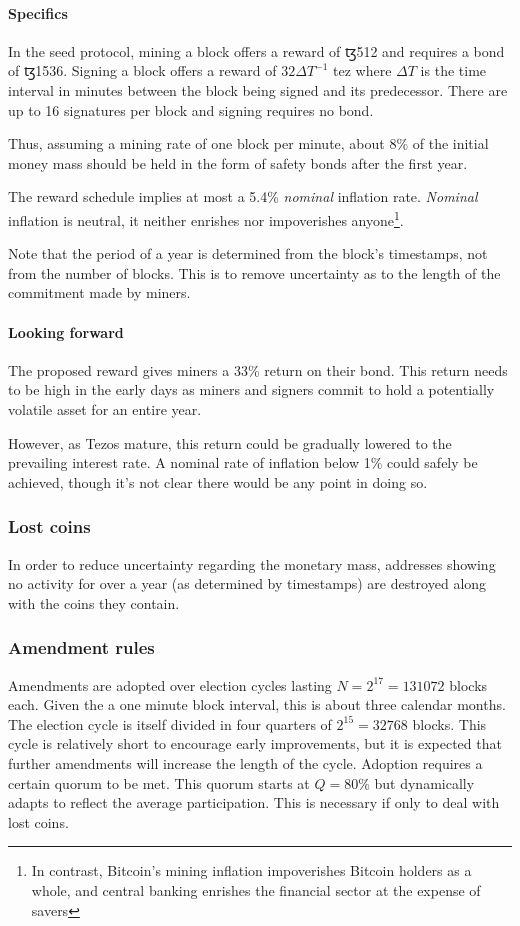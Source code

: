 \documentclass[letterpaper]{article}
\newcommand{\tz}{{\fontspec{DejaVu Sans} \small{ꜩ}}}
\begin{document}
\paragraph{Specifics}
In the seed protocol, mining a block offers a reward of \tz\num{512} and
requires a bond of \tz\num{1536}. Signing a block offers a reward of
$32\Delta T^{-1}$ tez where $\Delta T$ is the time interval in minutes between
the block being signed and its predecessor. There are up to 16 signatures per block
and signing requires no bond.

Thus, assuming a mining rate of one block per minute, about 8\% of the initial
money mass should be held in the form of safety bonds after the first year.

The reward schedule implies at most a 5.4\% \emph{nominal} inflation
rate. \emph{Nominal} inflation is neutral, it neither enrishes nor
impoverishes anyone\footnote{In contrast, Bitcoin's mining inflation impoverishes
Bitcoin holders as a whole, and central banking enrishes the financial
sector at the expense of savers}.

Note that the period of a year is determined from the block's timestamps, not
from the number of blocks. This is to remove uncertainty as to the length of
the commitment made by miners. 

\paragraph{Looking forward}
The proposed reward gives miners a 33\% return on their bond.
This return needs to be high in the early days as miners and signers commit
to hold a potentially volatile asset for an entire year.

However, as Tezos mature, this return could be gradually lowered to the
prevailing interest rate. A nominal rate of inflation below 1\% could safely be
achieved, though it's not clear there would be any point in doing so.

\subsubsection{Lost coins}
In order to reduce uncertainty regarding the monetary mass, addresses
showing no activity for over a year (as determined by timestamps)
are destroyed along with the coins they contain.

\subsubsection{Amendment rules}
Amendments are adopted over election cycles lasting $N = 2^{17} = \num{131072}$
blocks each. Given the  a one minute block interval, this is about three
calendar months. The election cycle is itself divided in four quarters of
$2^{15} = \num{32768}$ blocks. This cycle is relatively short to encourage early
improvements, but it is expected that further amendments will increase the
length of the cycle. Adoption requires a certain quorum to be met. This quorum
starts at $Q = 80\%$ but dynamically adapts to reflect the average
participation. This is necessary if only to deal with lost coins.
 
\end{document}
